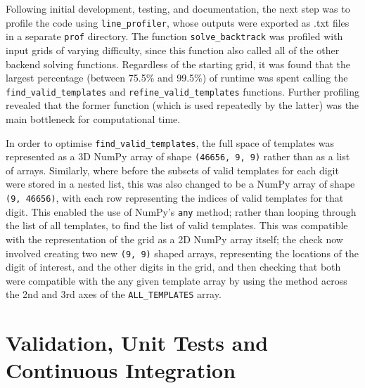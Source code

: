 \documentclass[12pt]{article}
\begin{document}
Following initial development, testing, and documentation, the next step was to profile the code using \texttt{line\_profiler}, whose outputs were exported as .txt files in a separate \texttt{prof} directory.
The function \texttt{solve\_backtrack} was profiled with input grids of varying difficulty, since this function also called all of the other backend solving functions.
Regardless of the starting grid, it was found that the largest percentage (between 75.5\% and 99.5\%) of runtime was spent calling the \texttt{find\_valid\_templates} and \texttt{refine\_valid\_templates} functions.
Further profiling revealed that the former function (which is used repeatedly by the latter) was the main bottleneck for computational time.

In order to optimise \texttt{find\_valid\_templates}, the full space of templates was represented as a 3D NumPy array of shape \texttt{(46656, 9, 9)} rather than as a list of arrays.
Similarly, where before the subsets of valid templates for each digit were stored in a nested list, this was also changed to be a NumPy array of shape \texttt{(9, 46656)}, with each row representing the indices of valid templates for that digit.
This enabled the use of NumPy's \texttt{any} method; rather than looping through the list of all templates, to find the list of valid templates.
This was compatible with the representation of the grid as a 2D NumPy array itself; the check now involved creating two new \texttt{(9, 9)} shaped arrays, representing the locations of the digit of interest, and the other digits in the grid, and then checking that both were compatible with the any given template array by using the  method across the 2nd and 3rd axes of the \texttt{ALL\_TEMPLATES} array.

\section*{Validation, Unit Tests and Continuous Integration}
\end{document}
